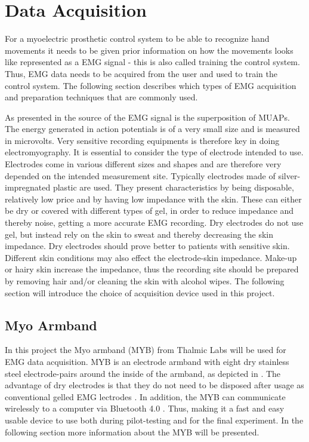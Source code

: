 \section{Data Acquisition} \label{sec:BG:dataAcquisition}
For a myoelectric prosthetic control system to be able to recognize hand movements it needs to be given prior information on how the movements looks like represented as a EMG signal - this is also called training the control system. Thus, EMG data needs to be acquired from the user and used to train the control system. The following section describes which types of EMG acquisition and preparation techniques that are commonly used.

As presented in  the source of the EMG signal is the superposition of MUAPs. The energy generated in action potentials is of a very small size and is measured in microvolts. Very sensitive recording equipments is therefore key in doing electromyography. It is essential to consider the type of electrode intended to use. Electrodes come in various different sizes and shapes and are therefore very depended on the intended measurement site. Typically electrodes made of silver-impregnated plastic are used. They present characteristics by being disposable, relatively low price and by having low impedance with the skin. %
These can either be dry or covered with different types of gel, in order to reduce impedance and thereby noise, getting a more accurate EMG recording. Dry electrodes do not use gel, but instead rely on the skin to sweat and thereby decreasing the skin impedance. Dry electrodes should prove better to patients with sensitive skin. Different skin conditions may also effect the electrode-skin impedance. Make-up or hairy skin increase the impedance, thus the recording site should be prepared by removing hair and/or cleaning the skin with alcohol wipes. \cite{Cram2012} The following section will introduce the choice of acquisition device used in this project.

\subsection{Myo Armband} \label{sub:BG:MYB}
In this project the Myo armband (MYB) from Thalmic Labs will be used for EMG data acquisition. MYB is an electrode armband with eight dry stainless steel electrode-pairs around the inside of the armband, as depicted in . The advantage of dry electrodes is that they do not need to be disposed after usage as conventional gelled EMG lectrodes \cite{Cram2012}. In addition, the MYB can communicate wirelessly to a computer via Bluetooth 4.0 \cite{Myoarmband2013}. Thus, making it a fast and easy usable device to use both during pilot-testing and for the final experiment. In the following section more information about the MYB will be presented.

